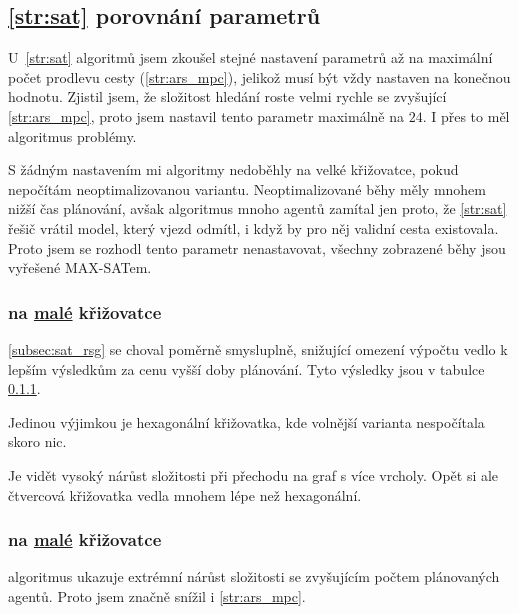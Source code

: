 \subsection{\ref{str:sat} porovnání parametrů}\label{subsec:sat_porovnani_parametru}

U~\ref{str:sat} algoritmů jsem zkoušel stejné nastavení parametrů až na maximální počet prodlevu cesty (\ref{str:ars_mpc}),
jelikož musí být vždy nastaven na konečnou hodnotu.
Zjistil jsem, že složitost hledání roste velmi rychle se zvyšující \ref{str:ars_mpc},
proto jsem nastavil tento parametr maximálně na $24$.
I přes to měl algoritmus problémy.

S žádným nastavením mi algoritmy nedoběhly na velké křižovatce, pokud nepočítám neoptimalizovanou variantu.
Neoptimalizované běhy měly mnohem nižší čas plánování, avšak algoritmus mnoho agentů zamítal jen proto, že \ref{str:sat}
řešič vrátil model, který vjezd odmítl, i když by pro něj validní cesta existovala.
Proto jsem se rozhodl tento parametr nenastavovat, všechny zobrazené běhy jsou vyřešené \textrm{MAX-SAT}em.

\subsubsection{ na \hyperref[par:data_mala]{malé} křižovatce}
\label{subsubsec:exp_satsg_mala_krizovatka}



\ref{subsec:sat_rsg} se choval poměrně smysluplně, snižující omezení výpočtu vedlo k lepším výsledkům
za cenu vyšší doby plánování.
Tyto výsledky jsou v tabulce \ref{subsubsec:exp_satsg_mala_krizovatka}.

Jedinou výjimkou je hexagonální křižovatka, kde volnější varianta nespočítala skoro nic.

Je vidět vysoký nárůst složitosti při přechodu na graf s více vrcholy.
Opět si ale čtvercová křižovatka vedla mnohem lépe než hexagonální.

\subsubsection{ na \hyperref[par:data_mala]{malé} křižovatce}
\label{subsubsec:exp_sata_mala_krizovatka}

 algoritmus ukazuje extrémní nárůst složitosti se zvyšujícím počtem plánovaných agentů.
Proto jsem značně snížil i \ref{str:ars_mpc}.

